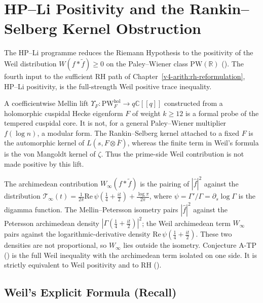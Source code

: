 \chapter{HP--Li Positivity and the Rankin--Selberg Kernel Obstruction}
\label{v4-arith:w5-a:chapter}

The HP--Li programme reduces the Riemann Hypothesis to the
positivity of the Weil distribution \(W(f*\widetilde{f})\geq 0\) on the
Paley--Wiener class \(\mathrm{PW}(\mathbb{R})\)
(). The
fourth input to the sufficient RH path of
Chapter~\ref{v4-arith:rh-reformulation}, HP--Li positivity, is the
full-strength Weil positive trace inequality.

A coefficientwise Mellin lift
\(\Upsilon_{F}\colon\mathrm{PW}^{\mathrm{hol}}_{F}\to q\mathbb C[[q]]\)
constructed from a holomorphic cuspidal Hecke eigenform \(F\) of weight
\(k\geq 12\) is a formal probe of the tempered cuspidal core. It is not,
for a general Paley--Wiener multiplier \(f(\log n)\), a modular form.
The Rankin--Selberg kernel attached to a fixed \(F\) is the automorphic
kernel of \(L(s,F\otimes\overline F)\), whereas the finite term in
Weil's formula is the von Mangoldt kernel of \(\zeta\). Thus the
prime-side Weil contribution is not made positive by this lift.

The archimedean contribution \(W_{\infty}(f*\widetilde{f})\) is the
pairing of \(|\widehat{f}|^{2}\) against the distribution
\(\mathcal{T}_{\infty}(t)=\frac{1}{2\pi}\mathrm{Re}\,\psi(\tfrac{1}{4}+\tfrac{it}{2})+\frac{\log\pi}{2\pi}\),
where \(\psi=\Gamma'/\Gamma=\partial_{s}\log\Gamma\) is the digamma function.
The Mellin--Petersson isometry pairs \(|\widehat{f}|^{2}\) against the
Petersson archimedean density \(|\Gamma(\tfrac{1}{4}+\tfrac{it}{2})|^{2}\);
the Weil archimedean term \(W_{\infty}\) pairs against the
logarithmic-derivative density \(\mathrm{Re}\,\psi(\tfrac{1}{4}+\tfrac{it}{2})\).
These two densities are not proportional, so \(W_{\infty}\) lies outside
the isometry.
Conjecture A-TP ()
is the full Weil inequality with the archimedean term isolated on one
side. It is strictly equivalent to Weil positivity and to RH
().

\section{Weil's Explicit Formula (Recall)}
\label{v4-arith:w5-a:weil-explicit}


